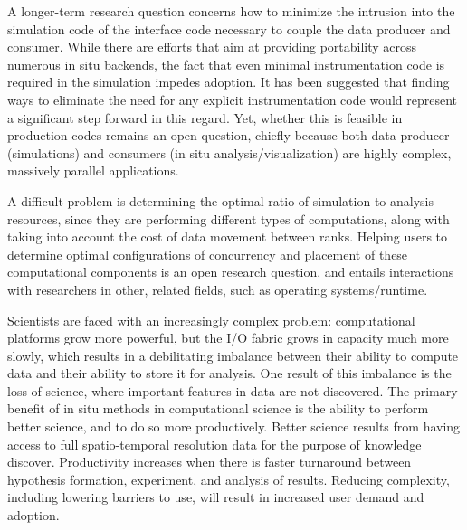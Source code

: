 A longer-term research question concerns how to minimize the intrusion into the simulation code of the interface code necessary to couple the data producer and consumer. 
While there are efforts that aim at providing portability across numerous in situ backends, the fact that even minimal instrumentation code is required in the simulation impedes adoption. 
It has been suggested that finding ways to eliminate the need for any explicit instrumentation code would represent a significant step forward in this regard. 
Yet, whether this is feasible in production codes remains an open question, chiefly because both data producer (simulations) and consumers (in situ analysis/visualization) are highly complex, massively parallel applications. 

A difficult problem is determining the optimal ratio of simulation to analysis resources, since they are performing different types of computations, along with taking into account the cost of data movement between ranks. 
Helping users to determine optimal configurations of concurrency and placement of these computational components is an open research question, and entails interactions with researchers in other, related fields, such as operating systems/runtime.

Scientists are faced with an increasingly complex problem: computational platforms grow more powerful, but the I/O fabric grows in capacity much more slowly, which results in a debilitating imbalance between their ability to compute data and their ability to store it for analysis. 
One result of this imbalance is the loss of science, where important features in data are not discovered. 
The primary benefit of in situ methods in computational science is the ability to perform better science, and to do so more productively. 
Better science results from having access to full spatio-temporal resolution data for the purpose of knowledge discover. 
Productivity increases when there is faster turnaround between hypothesis formation, experiment, and analysis of results. 
Reducing complexity, including lowering barriers to use, will result in increased user demand and adoption. 

